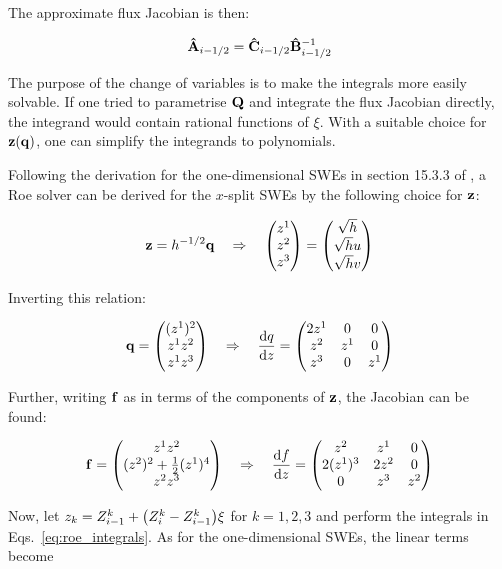 The approximate flux Jacobian is then:

\begin{align}
  \label{eq:roe_product}
  \vu A_{i-1/2} = \vu C_{i-1/2} \vu B_{i-1/2}^{-1}
\end{align}

The purpose of the change of variables is to make the integrals more easily solvable. If one tried to parametrise $\vb Q$ and integrate the flux Jacobian directly, the integrand would contain rational functions of $\xi$. With a suitable choice for $\vb z(\vb q)$, one can simplify the integrands to polynomials.

Following the derivation for the one-dimensional SWEs in section 15.3.3 of \citet{leveque2002finite}, a Roe solver can be derived for the $x$-split SWEs by the following choice for $\vb z$:

\begin{align}
  \vb z = h^{-1/2}\vb q \quad \Rightarrow \quad \mqty(z^1 \\ z^2 \\ z^3) = \mqty(\sqrt{h} \\ \sqrt{h}u \\ \sqrt{h}v)
\end{align}

Inverting this relation:

\begin{align}
  \vb q = \mqty((z^1)^2 \\ z^1z^2 \\ z^1z^3) \quad \Rightarrow \quad \dv{q}{z} = \mqty(
    2z^1 & 0 & 0 \\
    z^2 & z^1 & 0 \\
    z^3 & 0 & z^1
  )
\end{align}

Further, writing $\vb f$ as in terms of the components of $\vb z$, the Jacobian can be found:

\begin{align}
  \vb f = \mqty(z^1z^2 \\ (z^2)^2 + \frac{1}{2}(z^1)^4 \\ z^2z^3) \quad \Rightarrow \quad \dv{f}{z} = \mqty(
    z^2 & z^1 & 0 \\
    2 (z^1)^3 & 2 z^2 & 0 \\
    0 & z^3 & z^2
  )
\end{align}

Now, let $z_k = Z^k_{i-1} + \qty(Z^k_i - Z^k_{i-1})\xi$ for $k = 1, 2, 3$ and perform the integrals in Eqs.~\ref{eq:roe_integrals}. As for the one-dimensional SWEs, the linear terms become

